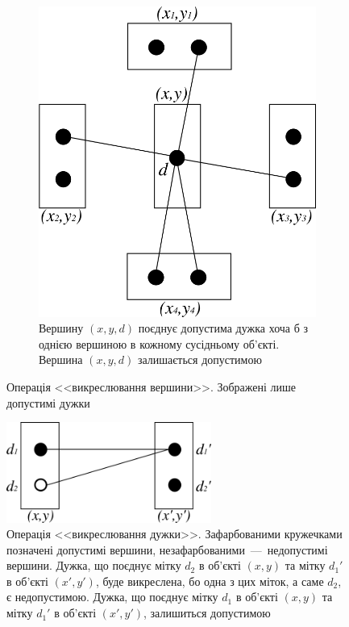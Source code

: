 \begin{figure}[h]
\begin{subfigure}[t]{0.45\textwidth}
        \includegraphics[width=\textwidth]{images/crossing_vertex_no}
        \caption{Вершину $\left(x, y, d \right)$
                 поєднує допустима дужка хоча б з однією
                 вершиною в кожному сусідньому об'єкті.
                 Вершина $\left(x, y, d \right)$ залишається допустимою}
        \label{fig:crossing:vertex:np}
    \end{subfigure}
    \caption{Операція <<викреслювання вершини>>.
             Зображені лише допустимі дужки}
    \label{fig:crossing:vertex}
\end{figure}

\begin{figure}[h]
  \centering
  \includegraphics[width=0.6\textwidth]{images/crossing_edge}
  \caption{Операція <<викреслювання дужки>>.
           Зафарбованими кружечками позначені допустимі вершини,
           незафарбованими~---~недопустимі вершини.
           Дужка, що поєднує мітку $d_2$ в об'єкті $\left(x, y\right)$
           та мітку $d_1'$ в об'єкті $\left(x', y' \right)$, буде викреслена,
           бо одна з цих міток, а саме $d_2$, є недопустимою.
           Дужка, що поєднує мітку $d_1$ в об'єкті $\left(x, y\right)$
           та мітку $d_1'$ в об'єкті $\left(x', y' \right)$,
           залишиться допустимою}
  \label{fig:crossing:edge}
\end{figure}

